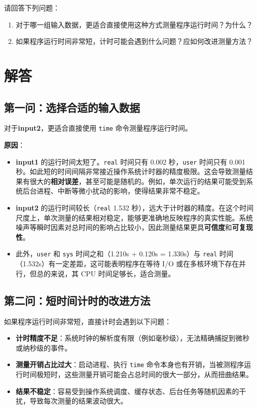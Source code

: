 请回答下列问题：
\begin{enumerate}
    \item 对于哪一组输入数据，更适合直接使用这种方式测量程序运行时间？为什么？
    \item 如果程序运行时间非常短，计时可能会遇到什么问题？应如何改进测量方法？
\end{enumerate}

\section{解答}

\subsection{第一问：选择合适的输入数据}
对于\textbf{input2}，更适合直接使用 \texttt{time} 命令测量程序运行时间。

\textbf{原因}：
\begin{itemize}
    \item \textbf{input1} 的运行时间太短了。\texttt{real} 时间只有 0.002 秒，\texttt{user} 时间只有 0.001 秒。如此短的时间间隔非常接近操作系统计时器的精度极限。这会导致测量结果有很大的\textbf{相对误差}，甚至可能是随机的。例如，单次运行的结果可能受到系统后台进程、中断等微小扰动的影响，使得结果非常不稳定。
    \item \textbf{input2} 的运行时间较长（\texttt{real} 1.532 秒），远大于计时器的精度。在这个时间尺度上，单次测量的结果相对稳定，能够更准确地反映程序的真实性能。系统噪声等瞬时因素对总时间的影响占比较小，因此测量结果更具\textbf{可信度}和\textbf{可复现性}。
    \item 此外，\texttt{user} 和 \texttt{sys} 时间之和（1.210s + 0.120s = 1.330s）与 \texttt{real} 时间（1.532s）有一定差距，这可能表明程序在等待 I/O 或在多核环境下存在并行，但总的来说，其 CPU 时间足够长，适合测量。
\end{itemize}

\subsection{第二问：短时间计时的改进方法}
如果程序运行时间非常短，直接计时会遇到以下问题：
\begin{itemize}
    \item \textbf{计时精度不足}：系统时钟的解析度有限（例如毫秒级），无法精确捕捉到微秒或纳秒级的事件。
    \item \textbf{测量开销占比过大}：启动进程、执行 \texttt{time} 命令本身也有开销，当被测程序运行时间极短时，这些测量开销可能会占总时间的很大一部分，从而扭曲结果。
    \item \textbf{结果不稳定}：容易受到操作系统调度、缓存状态、后台任务等随机因素的干扰，导致每次测量的结果波动很大。
\end{itemize}

